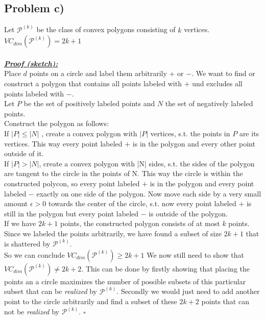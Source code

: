 \subsection*{Problem c)}
Let $\mathcal{P}^(k)$ be the class of convex polygons consisting of $k$ vertices.\\
$VC_{dim}(\mathcal{P}^{(k)}) = 2k+1$\\
\\
\textbf{\underline{\textit{Proof (sketch):}}}\\
Place $d$ points on a circle and label them arbitrarily $+$ or $-$.
We want to find or construct a polygon that contains all points labeled with $+$ und excludes all points labeled with $-$.\\
Let $P$ be the set of positively labeled points and $N$ the set of negatively labeled points.\\
Construct the polygon as follows:\\
If $|P|\leq |N|$ , create a convex polygon with $|P|$ vertices, s.t. the points in $P$ are its vertices. This way every point labeled $+$ is in the polygon and every other point outside of it.\\
If $|P|>|N|$, create a convex polygon with |N| sides, s.t. the sides of the polygon are tangent to the circle in the points of N. This way the circle is within the constructed polycon, so every point labeled $+$ is in the polygon and every point labeled $-$ exactly on one side of the polygon. Now move each side by a very small amount $\epsilon > 0$ towards the center of the circle, s.t. now every point labeled $+$ is still in the polygon but every point labeled $-$ is outside of the polygon.\\
If we have $2k+1$ points, the constructed polygon consists of at most $k$ points. Since we labeled the points arbitrarily, we have found a subset of size $2k+1$ that is shattered by $\mathcal{P}^{(k)}$.\\
So we can conclude $VC_{dim}(\mathcal{P}^{(k)}) \geq 2k+1$
We now still need to show that $VC_{dim}(\mathcal{P}^{(k)}) \neq 2k+2$.
This can be done by firstly showing that placing the points an a circle maximizes the number of possible subsets of this particular subset that can be \textit{realized} by $\mathcal{P}^{(k)}$. Secondly we would just need to add another point to the circle arbitrarily and find a subset of these $2k+2$ points that can not be \textit{realized} by $\mathcal{P}^{(k)}$.
\hfill$\square$